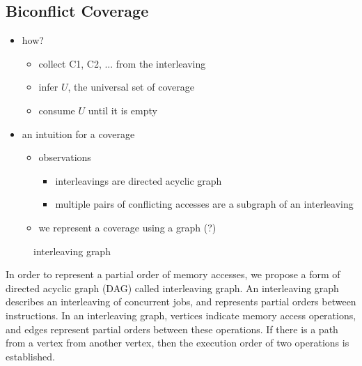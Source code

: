 



\subsection{Biconflict Coverage}
\label{ss:coverage}

\newcommand{\mutable}{mutable edge\xspace}
\newcommand{\mutables}{mutable edges\xspace}
\newcommand{\immutable}{immutable edge\xspace}
\newcommand{\immutables}{immutable edges\xspace}


\begin{itemize}
\item how?
  \begin{itemize}
  \item collect {C1, C2, ...} from the interleaving
  \item infer $U$, the universal set of coverage
  \item consume $U$ until it is empty
  \end{itemize}
\item an intuition for a coverage
  \begin{itemize}
  \item observations
    \begin{itemize}
    \item interleavings are directed acyclic graph
    \item multiple pairs of conflicting accesses are a subgraph of an interleaving
    \end{itemize}
  \item we represent a coverage using a graph (?)
  \end{itemize}
\end{itemize}



\begin{figure}[t]
  \caption{interleaving graph}
  \label{fig:interleaving-graph}
\end{figure}

In order to represent a partial order of memory accesses, we propose a
form of directed acyclic graph (DAG) called interleaving graph.
%
An interleaving graph describes an interleaving of concurrent jobs,
and represents partial orders between instructions.
%
In an interleaving graph, vertices indicate memory access operations,
and edges represent partial orders between these operations.
%
If there is a path from a vertex from another vertex, then the
execution order of two operations is established.

